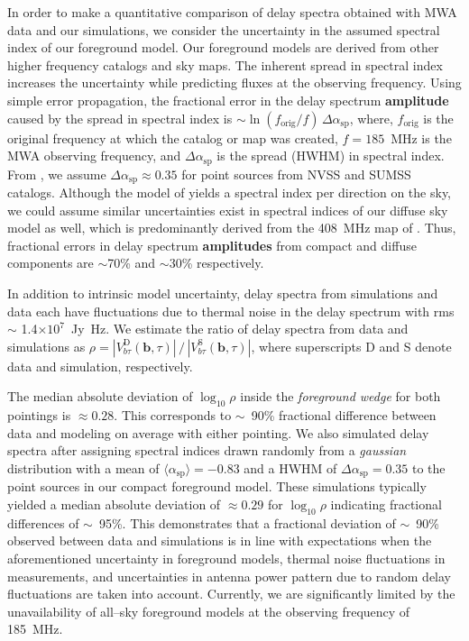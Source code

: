 \documentclass[preprint2,iop,numberedappendix]{emulateapj}
\begin{document}
In order to make a quantitative comparison of delay spectra obtained with MWA data and our simulations, we consider the uncertainty in the assumed spectral index of our foreground model. Our foreground models are derived from other higher frequency catalogs and sky maps. The inherent spread in spectral index increases the uncertainty while predicting fluxes at the observing frequency. Using simple error propagation, the fractional error in the delay spectrum {\bf amplitude} caused by the spread in spectral index is $\sim \ln(f_\textrm{orig}/f)\,\Delta\alpha_\textrm{sp}$, where, $f_\textrm{orig}$ is the original frequency at which the catalog or map was created, $f=185$~MHz is the MWA observing frequency, and $\Delta\alpha_\textrm{sp}$ is the spread (HWHM) in spectral index. From \citet{mau03}, we assume $\Delta\alpha_\textrm{sp} \approx 0.35$ for point sources from NVSS and SUMSS catalogs. Although the model of \citet{deo08} yields a spectral index per direction on the sky, we could assume similar uncertainties exist in spectral indices of our diffuse sky model as well, which is predominantly derived from the 408~MHz map of \citet{has82}. Thus, fractional errors in delay spectrum {\bf amplitudes} from compact and diffuse components are $\sim$70\% and $\sim$30\% respectively. 

In addition to intrinsic model uncertainty, delay spectra from simulations and data each have fluctuations due to thermal noise in the delay spectrum with rms $\sim$ 1.4$\times 10^7$~Jy~Hz. We estimate the ratio of delay spectra from data and simulations as $\rho = |V^\textrm{D}_{b\tau}(\boldsymbol{b},\tau)|\,/\,|V^\textrm{S}_{b\tau}(\boldsymbol{b},\tau)|$, where superscripts D and S denote data and simulation, respectively. 

The median absolute deviation of $\log_{10}\rho$ inside the {\it foreground wedge} for both pointings is $\approx 0.28$. This corresponds to $\sim$~90\% fractional difference between data and modeling on average with either pointing. We also simulated delay spectra after assigning spectral indices drawn randomly from a {\it gaussian} distribution with a mean of $\langle\alpha_\textrm{sp}\rangle=-0.83$ and a HWHM of $\Delta\alpha_\textrm{sp}=0.35$ to the point sources in our compact foreground model. These simulations typically yielded a median absolute deviation of $\approx 0.29$ for $\log_{10}\rho$ indicating fractional differences of $\sim$~95\%. This demonstrates that a fractional deviation of $\sim$~90\% observed between data and simulations is in line with expectations when the aforementioned uncertainty in foreground models, thermal noise fluctuations in measurements, and uncertainties in antenna power pattern due to random delay fluctuations are taken into account. Currently, we are significantly limited by the unavailability of all--sky foreground models at the observing frequency of 185~MHz. 
\end{document}
